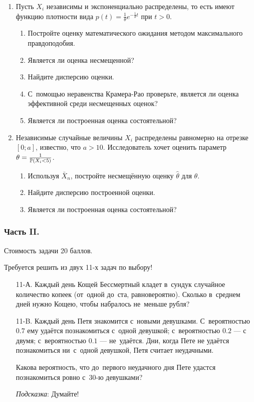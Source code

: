 \begin{enumerate}
\item Пусть $X_{i}$ независимы и экспоненциально распределены, то есть имеют функцию
плотности вида
$p(t)=\frac{1}{\theta}e^{-\frac{1}{\theta}t}$ при $t>0$.
\begin{enumerate}
\item Постройте оценку математического ожидания методом максимального правдоподобия.
\item Является ли оценка несмещенной?
\item Найдите дисперсию оценки.
\item С~помощью неравенства Крамера-Рао проверьте, является ли оценка эффективной
среди несмещенных оценок?
\item Является ли построенная оценка состоятельной?
\end{enumerate}


\item Независимые случайные величины $X_{i}$ распределены равномерно на отрезке
$[0;a]$, известно, что $a>10$. Исследователь хочет оценить параметр $\theta =
\frac{1}{\P(X_{i}<5)}$.
\begin{enumerate}
\item Используя $\bar X_{n}$, постройте несмещённую оценку $\hat{\theta}$ для $\theta$.
\item Найдите дисперсию построенной оценки.
\item Является ли построенная оценка состоятельной?
\end{enumerate}
\end{enumerate}

\subsubsection*{Часть II.}

Стоимость задачи 20 баллов.

Требуется решить \textbf{} из двух 11-х задач по выбору!

\begin{enumerate}
\item[11-А.] Каждый день Кощей Бессмертный кладет в~сундук случайное количество
копеек (от~одной до~ста, равновероятно). Сколько в~среднем дней нужно Кощею,
чтобы набралось не~меньше рубля?

\item[11-B.] Каждый день Петя знакомится с~новыми девушками. С~вероятностью $0.7$
ему удаётся познакомиться с~одной девушкой; с~вероятностью $0.2$ — с двумя;
с~вероятностью $0.1$ — не~удаётся. Дни, когда Пете не удаётся познакомиться
ни~с~одной девушкой, Петя считает неудачными.

Какова вероятность, что до~первого неудачного дня Пете удастся познакомиться ровно
с~30-ю девушками?

\emph{Подсказка}: Думайте!
\end{enumerate}



